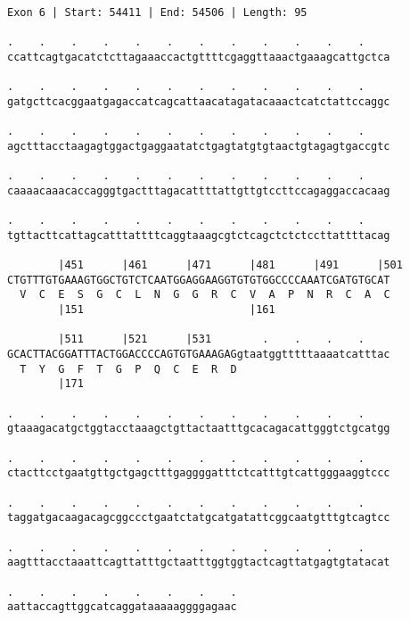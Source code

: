\documentclass{article}
\begin{document}
\begin{Verbatim}
Exon 6 | Start: 54411 | End: 54506 | Length: 95
 
.    .    .    .    .    .    .    .    .    .    .    .    
ccattcagtgacatctcttagaaaccactgttttcgaggttaaactgaaagcattgctca
  
.    .    .    .    .    .    .    .    .    .    .    .    
gatgcttcacggaatgagaccatcagcattaacatagatacaaactcatctattccaggc
  
.    .    .    .    .    .    .    .    .    .    .    .    
agctttacctaagagtggactgaggaatatctgagtatgtgtaactgtagagtgaccgtc
  
.    .    .    .    .    .    .    .    .    .    .    .    
caaaacaaacaccagggtgactttagacattttattgttgtccttccagaggaccacaag
  
.    .    .    .    .    .    .    .    .    .    .    .    
tgttacttcattagcatttattttcaggtaaagcgtctcagctctctccttattttacag
  
        |451      |461      |471      |481      |491      |501
CTGTTTGTGAAAGTGGCTGTCTCAATGGAGGAAGGTGTGTGGCCCCAAATCGATGTGCAT
  V  C  E  S  G  C  L  N  G  G  R  C  V  A  P  N  R  C  A  C
        |151                          |161                  
  
        |511      |521      |531        .    .    .    .    
GCACTTACGGATTTACTGGACCCCAGTGTGAAAGAGgtaatggtttttaaaatcatttac
  T  Y  G  F  T  G  P  Q  C  E  R  D                        
        |171                                                
  
.    .    .    .    .    .    .    .    .    .    .    .    
gtaaagacatgctggtacctaaagctgttactaatttgcacagacattgggtctgcatgg
  
.    .    .    .    .    .    .    .    .    .    .    .    
ctacttcctgaatgttgctgagctttgaggggatttctcatttgtcattgggaaggtccc
  
.    .    .    .    .    .    .    .    .    .    .    .    
taggatgacaagacagcggccctgaatctatgcatgatattcggcaatgtttgtcagtcc
  
.    .    .    .    .    .    .    .    .    .    .    .    
aagtttacctaaattcagttatttgctaatttggtggtactcagttatgagtgtatacat
  
.    .    .    .    .    .    .    .
aattaccagttggcatcaggataaaaaggggagaac
\end{Verbatim}
\newpage
\end{document}
